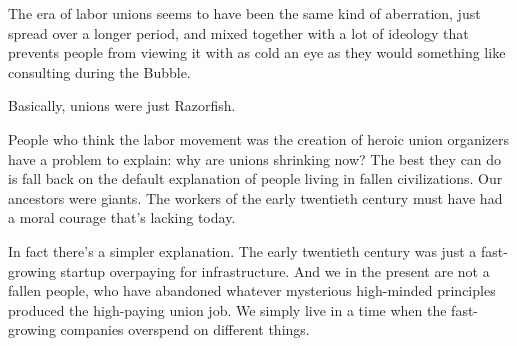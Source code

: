 The era of labor unions seems to have been the same kind of aberration,
just spread over a longer period, and mixed together with a lot of
ideology that prevents people from viewing it with as cold an eye as
they would something like consulting during the Bubble.

Basically, unions were just Razorfish.

People who think the labor movement was the creation of heroic union
organizers have a problem to explain: why are unions shrinking now? The
best they can do is fall back on the default explanation of people
living in fallen civilizations. Our ancestors were giants. The workers
of the early twentieth century must have had a moral courage that's
lacking today.

In fact there's a simpler explanation. The early twentieth century was
just a fast-growing startup overpaying for infrastructure. And we in the
present are not a fallen people, who have abandoned whatever mysterious
high-minded principles produced the high-paying union job. We simply
live in a time when the fast-growing companies overspend on different
things.